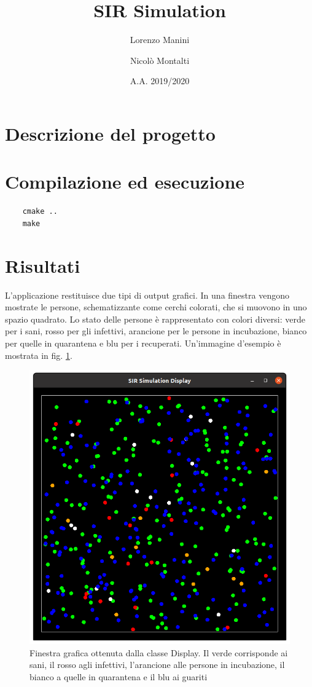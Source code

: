 \documentclass[a4paper,10pt,twocolumn]{article}
\begin{document}
\title{SIR Simulation}
\author{Lorenzo Manini \and Nicolò Montalti}
\date{A.A. 2019/2020}

\maketitle

\section{Descrizione del progetto}
\section{Compilazione ed esecuzione}

\begin{verbatim}
    cmake ..
    make
\end{verbatim}

\section{Risultati}
L'applicazione restituisce due tipi di output grafici. In una finestra vengono mostrate le persone, schematizzante come cerchi colorati, che si muovono in uno spazio quadrato. Lo stato delle persone è rappresentato con colori diversi: verde per i sani, rosso per gli infettivi, arancione per le persone in incubazione, bianco per quelle in quarantena e blu per i recuperati. Un'immagine d'esempio è mostrata in fig. \ref{fig:display}.

\begin{figure}
    \includegraphics[width=\linewidth]{images/display.png}
    \caption{Finestra grafica ottenuta dalla classe Display. Il verde corrisponde ai sani, il rosso agli infettivi, l'arancione alle persone in incubazione, il bianco a quelle in quarantena e il blu ai guariti}
    \label{fig:display}
\end{figure}
\end{document}
